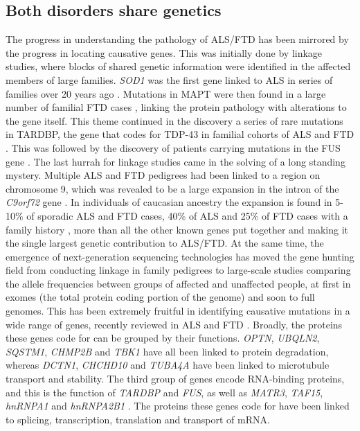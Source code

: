 \subsection{Both disorders share genetics}
The progress in understanding the pathology of ALS/FTD has been mirrored by the progress in locating causative genes. This was initially done by linkage studies, where blocks of shared genetic information were identified in the affected members of large families. \textit{SOD1} was the first gene linked to ALS in series of families over 20 years ago \citep{Rosen1993}. Mutations in MAPT were then found in a large number of familial FTD cases \citep{Hutton1998}, linking the protein pathology with alterations to the gene itself. This theme continued in the discovery a series of rare mutations in TARDBP, the gene that codes for TDP-43 in familial cohorts of ALS and FTD \citep{Sreedharan2008-xv}. This was followed by the discovery of patients carrying mutations in the FUS gene \citep{Vance2009-ye}. The last hurrah for linkage studies came in the solving of a long standing mystery. Multiple ALS and FTD pedigrees had been linked to a region on chromosome 9, which was revealed to be a large expansion in the intron of the \textit{C9orf72} gene \citep{Renton2011,DeJesus-Hernandez2011}. In individuals of caucasian ancestry the expansion is found in 5-10\% of sporadic ALS and FTD cases, 40\% of ALS and 25\% of FTD cases with a family history \citep{Majounie2012}, more than all the other known genes put together and making it the single largest genetic contribution to ALS/FTD. At the same time, the emergence of next-generation sequencing technologies has moved the gene hunting field from conducting linkage in family pedigrees to large-scale studies comparing the allele frequencies between groups of affected and unaffected people, at first in exomes (the total protein coding portion of the genome) and soon to full genomes. This has been extremely fruitful in identifying causative mutations in a wide range of genes, recently reviewed in ALS \citep{Taylor2016} and FTD \citep{Pottier2016}. Broadly, the proteins these genes code for can be grouped by their functions. \textit{OPTN}, \textit{UBQLN2}, \textit{SQSTM1}, \textit{CHMP2B} and \textit{TBK1} have all been linked to protein degradation, whereas \textit{DCTN1}, \textit{CHCHD10} and \textit{TUBA4A} have been linked to microtubule transport and stability. The third group of genes encode RNA-binding proteins, and this is the function of \textit{TARDBP} and \textit{FUS}, as well as \textit{MATR3}, \textit{TAF15}, \textit{hnRNPA1} and \textit{hnRNPA2B1} . The proteins these genes code for have been linked to splicing, transcription, translation and transport of mRNA. 

